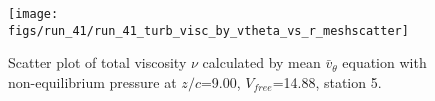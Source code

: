 \begin{figure}[H]
\centering
\texttt{[image: figs/run\_41/run\_41\_turb\_visc\_by\_vtheta\_vs\_r\_meshscatter]}
\caption{Scatter plot of total viscosity $\nu$ calculated by mean $\bar{v}_{\theta}$ equation with non-equilibrium pressure at $z/c$=9.00, $V_{free}$=14.88, station 5.}
\label{fig:run_41_turb_visc_by_vtheta_vs_r_meshscatter}
\end{figure}


